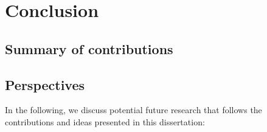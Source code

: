 \chapter{Conclusion}
\label{chap:conclusion}


\section{Summary of contributions}



\section{Perspectives}

In the following, we discuss potential future research that follows the contributions and ideas presented in this dissertation:
